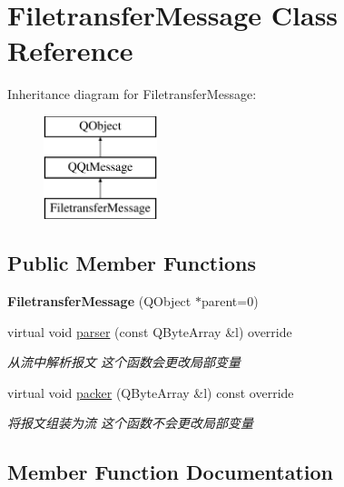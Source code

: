\hypertarget{class_filetransfer_message}{}\section{Filetransfer\+Message Class Reference}
\label{class_filetransfer_message}
Inheritance diagram for Filetransfer\+Message\+:\begin{figure}[H]
\begin{center}
\leavevmode
\includegraphics[height=3.000000cm]{class_filetransfer_message}
\end{center}
\end{figure}
\subsection*{Public Member Functions}
\begin{DoxyCompactItemize}
\item 
\mbox{\label{class_filetransfer_message_adeb6c0caef6de89de36fdd5d604358fa}} 
{\bfseries Filetransfer\+Message} (Q\+Object $\ast$parent=0)
\item 
virtual void \mbox{\hyperlink{class_filetransfer_message_a3f25d77aadf5f260ef3696d9bec4b34e}{parser}} (const Q\+Byte\+Array \&l) override
\begin{DoxyCompactList}\small\item\em 从流中解析报文 这个函数会更改局部变量 \end{DoxyCompactList}\item 
virtual void \mbox{\hyperlink{class_filetransfer_message_a455e81f50ff70980649f198f8a3250ce}{packer}} (Q\+Byte\+Array \&l) const override
\begin{DoxyCompactList}\small\item\em 将报文组装为流 这个函数不会更改局部变量 \end{DoxyCompactList}\end{DoxyCompactItemize}


\subsection{Member Function Documentation}
\mbox{\label{class_filetransfer_message_a455e81f50ff70980649f198f8a3250ce}} 
